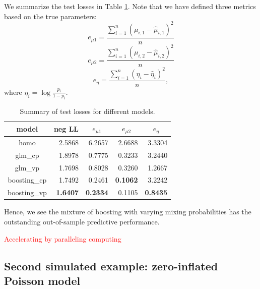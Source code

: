 \documentclass[11pt]{article}
\numberwithin{equation}{section}
\newcommand{\red}[1]{\textcolor{red}{#1}}
\begin{document}
We summarize the test losses in Table \ref{gaussian-summary}. Note that we have defined three metrics based on the true parameters: 
	$$e_{\mu 1}=\frac{\sum_{i=1}^{n}(\mu_{i,1}-\hat{\mu}_{i,1})^2}{n}$$
	$$e_{\mu 2}=\frac{\sum_{i=1}^{n}(\mu_{i,2}-\hat{\mu}_{i,2})^2}{n}$$
	$$e_{\eta}=\frac{\sum_{i=1}^{n}(\eta_{i}-\hat{\eta}_{i})^2}{n},$$
	where $\eta_i=\log\frac{p_i}{1-p_i}$.
	\begin{table}[htp!]
		\centering
		\caption{Summary of test losses for different models.}\label{gaussian-summary}
		\begin{tabular}{c|rrrr}
			\hline
			model        & \multicolumn{1}{c}{neg LL} & \multicolumn{1}{c}{$e_{\mu 1}$} & \multicolumn{1}{c}{$e_{\mu 2}$} & \multicolumn{1}{c}{$e_{\eta}$} \\ \hline
			homo         & 2.5868                   & 6.2657                         & 2.6688                        & 3.3304                             \\
			glm\_cp      & 1.8978                   & 0.7775                         & 0.3233                         & 3.2440                             \\
			glm\_vp      & 1.7698                   & 0.8028                         & 0.3260                         & 1.2667                             \\
			boosting\_cp & 1.7492                   & 0.2461                         & {\bf 0.1062}                        & 3.2242                             \\
			boosting\_vp & {\bf 1.6407}                  & {\bf 0.2334}                         & 0.1105                         & {\bf 0.8435}                             \\ \hline
		\end{tabular}
	\end{table}
Hence, we see the mixture of boosting with varying mixing probabilities has the outstanding out-of-sample predictive performance.

\red{Accelerating by paralleling computing}


\subsection{Second simulated example: zero-inflated Poisson model}
\end{document}
